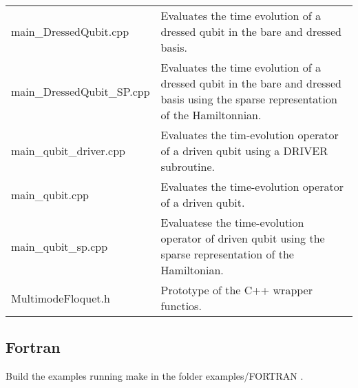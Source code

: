 \documentclass[10pt,a4paper]{article}
\begin{document}
\begin{tabular}{p{5.5cm}p{9.5cm}}
main\_DressedQubit.cpp  & Evaluates the time evolution of a dressed qubit in the bare and dressed basis. \\
main\_DressedQubit\_SP.cpp & Evaluates the time evolution of a dressed qubit in the bare and dressed basis using the sparse representation of the Hamiltonnian. \\
main\_qubit\_driver.cpp & Evaluates the tim-evolution operator of a driven qubit using a DRIVER subroutine.\\
main\_qubit.cpp  & Evaluates the time-evolution operator of a driven qubit.\\
main\_qubit\_sp.cpp & Evaluatese the time-evolution operator of driven qubit using the sparse representation of the Hamiltonian.\\  
MultimodeFloquet.h & Prototype of the C++ wrapper functios. 
\end{tabular}
\subsection{Fortran}
Build the examples running   make  in the folder   examples/FORTRAN  . 
\end{document}

